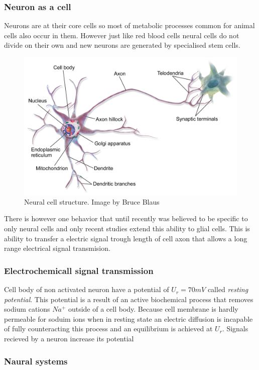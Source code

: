 \subsubsection{Neuron as a cell}
Neurons are at their core cells so most of metabolic processes common for animal cells also
occur in them. However just like red blood cells neural cells do not divide on their own and new
neurons are generated by specialised stem cells.
\begin{figure}[ht]
	\includegraphics[width=\textwidth]{res/Blausen_MultipolarNeuron}
	\caption{Neural cell structure. Image by Bruce Blaus}
	\label{fig:Blausen-Neuron}
\end{figure}
There is however one behavior that until recently was believed to be specific to only neural cells
and only recent studies extend this ability to glial cells.
This is ability to transfer a electric signal trough length of cell axon that allows a long range
electrical signal transmision.

\subsubsection{Electrochemicall signal transmission}
Cell body of non activated neuron have a potential of $U_{r}=70mV$ called 
\textit{resting potential}.
This potential is a result of an active biochemical process that removes sodium cations $Na^{+}$
outside of a cell body. Because cell membrane is hardly permeable for soduim ions when in resting
state an electric diffusion is incapable of fully counteracting this process and an equilibrium
is achieved at $U_{r}$.
Signals recieved by a neuron increase its potential

\subsubsection{Naural systems}

